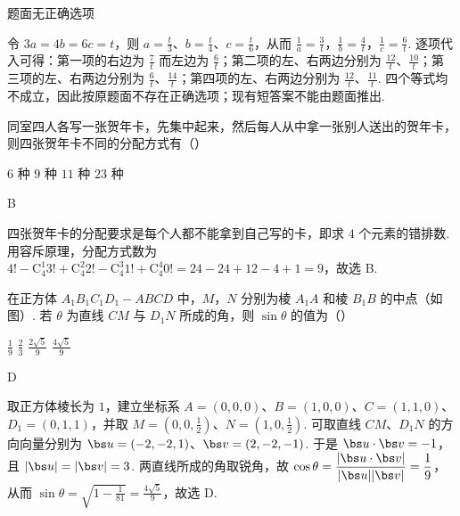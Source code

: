 \documentclass[UTF8,a4paper,oneside,11pt]{ctexbook}
\begin{document}
\begin{answer}
题面无正确选项
\end{answer}

\begin{solution}
令 \(3a=4b=6c=t\)，则 \(a=\frac{t}{3}\)、\(b=\frac{t}{4}\)、\(c=\frac{t}{6}\)，从而
\(\displaystyle \frac{1}{a}=\frac{3}{t}\)，\(\displaystyle \frac{1}{b}=\frac{4}{t}\)，\(\displaystyle \frac{1}{c}=\frac{6}{t}\). 逐项代入可得：第一项的右边为 \(\frac{7}{t}\) 而左边为 \(\frac{6}{t}\)；第二项的左、右两边分别为 \(\frac{12}{t}\)、\(\frac{10}{t}\)；第三项的左、右两边分别为 \(\frac{6}{t}\)、\(\frac{14}{t}\)；第四项的左、右两边分别为 \(\frac{12}{t}\)、\(\frac{11}{t}\). 四个等式均不成立，因此按原题面不存在正确选项；现有短答案不能由题面推出.
\end{solution}

\begin{problem}
同室四人各写一张贺年卡，先集中起来，然后每人从中拿一张别人送出的贺年卡，则四张贺年卡不同的分配方式有（\quad）

\choices
    {\(6\) 种}
    {\(9\) 种}
    {\(11\) 种}
    {\(23\) 种}
\end{problem}

\begin{answer}
B
\end{answer}

\begin{solution}
四张贺年卡的分配要求是每个人都不能拿到自己写的卡，即求 \(4\) 个元素的错排数. 用容斥原理，分配方式数为
\(\displaystyle 4!-\mathrm C_4^1 3!+\mathrm C_4^2 2!-\mathrm C_4^3 1!+\mathrm C_4^4 0!=24-24+12-4+1=9\)，故选 B.
\end{solution}

\begin{problem}
在正方体 \(A_{1}B_{1}C_{1}D_{1}-ABCD\) 中，\(M\)，\(N\) 分别为棱 \(A_{1}A\) 和棱 \(B_{1}B\) 的中点（如图）. 若 \(\theta\) 为直线 \(CM\) 与 \(D_{1}N\) 所成的角，则 \(\sin \theta\) 的值为（\quad）


\choices
    {\(\frac{1}{9}\)}
    {\(\frac{2}{3}\)}
    {\(\frac{2\sqrt{5}}{9}\)}
    {\(\frac{4\sqrt{5}}{9}\)}
\end{problem}

\begin{answer}
D
\end{answer}

\begin{solution}
取正方体棱长为 \(1\)，建立坐标系
\(A=(0,0,0)\)、\(B=(1,0,0)\)、\(C=(1,1,0)\)、\(D_1=(0,1,1)\)，并取 \(M=(0,0,\frac{1}{2})\)、\(N=(1,0,\frac{1}{2})\). 可取直线 \(CM\)、\(D_1N\) 的方向向量分别为 \(\bs u=(-2,-2,1)\)、\(\bs v=(2,-2,-1)\). 于是 \(\bs u\cdot\bs v=-1\)，且 \(|\bs u|=|\bs v|=3\). 两直线所成的角取锐角，故 \(\displaystyle \cos\theta=\frac{|\bs u\cdot\bs v|}{|\bs u||\bs v|}=\frac{1}{9}\)，从而 \(\displaystyle \sin\theta=\sqrt{1-\frac{1}{81}}=\frac{4\sqrt{5}}{9}\)，故选 D.
\end{solution}
\end{document}
